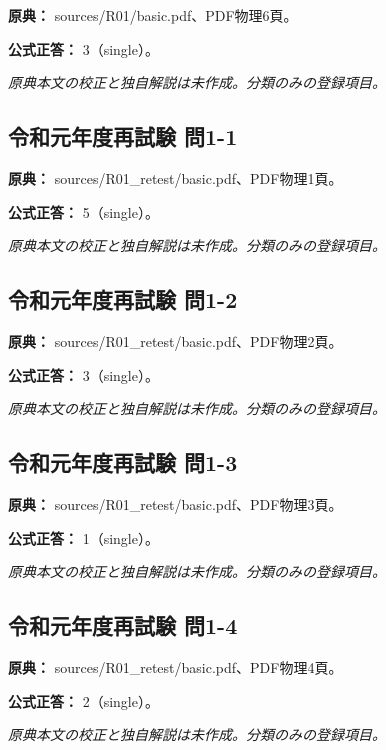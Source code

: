 \noindent\textbf{原典：} sources/R01/basic.pdf、PDF物理6頁。

\textbf{公式正答：} 3（single）。

\par\textit{原典本文の校正と独自解説は未作成。分類のみの登録項目。}

\subsection{令和元年度再試験 問1-1}
\label{q:r01-ret-basic-1-1}

\noindent\textbf{原典：} sources/R01\_retest/basic.pdf、PDF物理1頁。

\textbf{公式正答：} 5（single）。

\par\textit{原典本文の校正と独自解説は未作成。分類のみの登録項目。}

\subsection{令和元年度再試験 問1-2}
\label{q:r01-ret-basic-1-2}

\noindent\textbf{原典：} sources/R01\_retest/basic.pdf、PDF物理2頁。

\textbf{公式正答：} 3（single）。

\par\textit{原典本文の校正と独自解説は未作成。分類のみの登録項目。}

\subsection{令和元年度再試験 問1-3}
\label{q:r01-ret-basic-1-3}

\noindent\textbf{原典：} sources/R01\_retest/basic.pdf、PDF物理3頁。

\textbf{公式正答：} 1（single）。

\par\textit{原典本文の校正と独自解説は未作成。分類のみの登録項目。}

\subsection{令和元年度再試験 問1-4}
\label{q:r01-ret-basic-1-4}

\noindent\textbf{原典：} sources/R01\_retest/basic.pdf、PDF物理4頁。

\textbf{公式正答：} 2（single）。

\par\textit{原典本文の校正と独自解説は未作成。分類のみの登録項目。}

